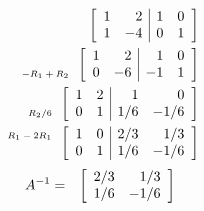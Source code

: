 \begin{problem}
{      \begin{eqnarray*}
        \startRowOpsTwo
        \oneRowOpsTwo{1}{2}{1}{0}
        \oneRowOpsTwo{1}{-4}{0}{1}
        \stopRowOps  \\
        \stateTwo{~}{-R_1+R_2}
        \startRowOpsTwo
        \oneRowOpsTwo{1}{2}{1}{0}
        \oneRowOpsTwo{0}{-6}{-1}{1}
        \stopRowOps  \\
        \stateTwo{~}{R_2/6}
        \startRowOpsTwo
        \oneRowOpsTwo{1}{2}{1}{0}
        \oneRowOpsTwo{0}{1}{1/6}{-1/6}
        \stopRowOps  \\
        \stateTwo{R_1-2R_1}{~}
        \startRowOpsTwo
        \oneRowOpsTwo{1}{0}{2/3}{1/3}
        \oneRowOpsTwo{0}{1}{1/6}{-1/6}
        \stopRowOps 
      \end{eqnarray*}
      \begin{eqnarray*}
        A^{-1} & = & \left[ \begin{array}{rr} 2/3 & 1/3 \\ 1/6 & -1/6 \end{array} \right] 
      \end{eqnarray*}

    }

        \vfill
        
  \end{problem}



